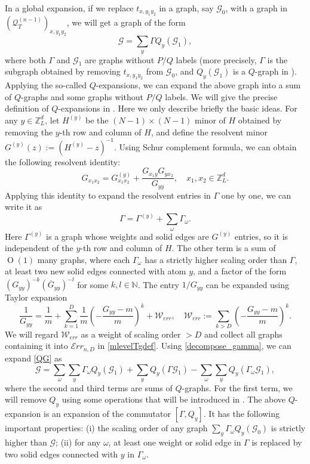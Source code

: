\documentclass{article}
\newcommand{\1}{\mathds{1}}
\numberwithin{equation}{section}
\newcommand{\be}{\begin{equation}}
\newcommand{\ee}{\end{equation}}
\renewcommand{\cal}{\mathcal}
\newcommand{\N}{\mathbb{N}}
\newcommand{\Z}{\mathbb{Z}}
\DeclareMathOperator{\OO}{O}
\theoremstyle{plain} %
\theoremstyle{remark}
\newcommand{\cor}{\color{red}}
\newcommand{\QT}{\mathcal Q_T}
\newcommand{\Err}{{\mathcal Err}}
\newcommand{\hty}[1]{{\cor (ht: #1) }}
\begin{document}
In a global expansion, if we replace $t_{x,y_1y_2}$ in a graph, say $\cal G_0$, with a graph in $(\QT^{(n-1)})_{x,y_1y_2}$, we will get a graph of the form  
\be\label{QG}\cal G=\sum_y \Gamma Q_y (\cal G_1) ,\ee
where both $\Gamma$ and $\cal G_1$ are graphs without $P/Q$ labels (more precisely, $\Gamma$ is the subgraph obtained by removing $t_{x,y_1 y_2}$ from $\cal G_0$, and $Q_y (\cal G_1)$ is a $Q$-graph in \smash{$(\QT^{(n-1)})_{x,y_1y_2}$}). Applying the so-called $Q$-expansions, we can expand the above graph into a sum of $Q$-graphs and some graphs without $P/Q$ labels. %
We will give the precise definition of $Q$-expansions in \cite{PartII_high}. Here we only describe briefly the basic ideas. For any $y\in \Z_L^d$, let $H^{(y)}$ be the $(N-1)\times(N-1)$ minor of $H$ obtained by removing the $y$-th row and column of $H$, and define the resolvent minor $G^{(y)}(z):=(H^{(y)}-z)^{-1}$. Using Schur complement formula, we can obtain the following resolvent identity:
$$G_{x_1x_2}=G_{x_1x_2}^{(y)}+\frac{G_{x_1 y}G_{yx_2}}{G_{yy}},\quad x_1,x_2\in \Z_L^d.$$
Applying this identity to expand the resolvent entries in $\Gamma$ one by one, we can write it as 
\be\label{decompose_gamma} \Gamma=\Gamma^{(y)}+\sum_{\omega} \Gamma_\omega.\ee 
Here $\Gamma^{(y)}$ is a graph whose weights and solid edges are $G^{(y)}$ entries, so it is independent of the $y$-th row and column of $H$. The other term is a sum of $\OO(1)$ many graphs, where each $\Gamma_\omega$ has a strictly higher scaling order than $\Gamma$, at least two new solid edges connected with atom $y$, and a factor of the form $(G_{yy})^{-k}(\overline G_{yy})^{-l}$ for some $k,l\in \N$. %
The entry $1/G_{yy}$ can be expanded using Taylor expansion
$$\frac{1}{G_{yy}}=\frac{1}{m} + \sum_{k=1}^{D}\frac1m\left(-\frac{G_{yy}-m}{m}\right)^k + \cal W_{err},\quad \cal W_{err}:=\sum_{k>D}\left(-\frac{G_{yy}-m}{m}\right)^k . $$
We will regard $\cal W_{err}$ as a weight of scaling order $>D$ and collect all  graphs containing it into $\Err_{n,D}$ in \eqref{mlevelTgdef}. Using \eqref{decompose_gamma}, we can expand \eqref{QG} as
\be\label{QG2}
\cal G=\sum_{\omega}\sum_y \Gamma_\omega Q_y(\cal G_1) + \sum_y Q_y\left( \Gamma \cal G_1\right)- \sum_{\omega}\sum_y Q_y\left(\Gamma_\omega \cal G_1\right),
\ee
where the second and third terms are sums of $Q$-graphs. For the first term, we will remove $Q_y$ using some operations that will be introduced in \cite{PartII_high}. The above $Q$-expansion is an expansion of the commutator $[\Gamma, Q_y]$. It has the following important properties: (i) the scaling order of any graph $\sum_y \Gamma_\omega Q_y(\cal G_0)$ is strictly higher than $\cal G$; (ii) for any $\omega$,  at least one weight or solid edge in $\Gamma$ is replaced by two solid edges connected with $y$ in  $\Gamma_\omega$. 
\end{document}
